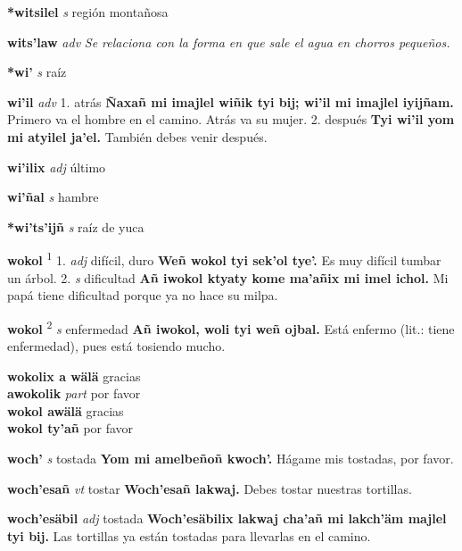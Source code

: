 \documentclass[10pt]{scrbook}
\newcommand{\entry}[1]{\textbf{#1}}
\newcommand{\onedefinition}[1]{#1.}
\newcommand{\defsuperscript}[1]{\textsuperscript{#1}}
\newcommand{\nontranslationdef}[1]{\textit{#1}}
\newcommand{\partofspeech}[1]{\textit{#1}}
\newcommand{\spanishtranslation}[1]{#1}
\newcommand{\cholexample}[1]{\textbf{#1}}
\newcommand{\exampletranslation}[1]{#1}
\newcommand{\secondaryentry}[1]{\\\textbf{#1}}
\newcommand{\secondpartofspeech}[1]{\textit{#1}}
\newcommand{\secondtranslation}[1]{#1}
\begin{document}
\begin{multicols}{2}
\entry{*witsilel}
\partofspeech{s}
\spanishtranslation{región montañosa}

\entry{wits'law}
\partofspeech{adv}
\nontranslationdef{Se relaciona con la forma en que sale el agua en chorros pequeños.}

\entry{*wi'}
\partofspeech{s}
\spanishtranslation{raíz}

\entry{wi'il}
\partofspeech{adv}
\onedefinition{1}
\spanishtranslation{atrás}
\cholexample{Ñaxañ mi imajlel wiñik tyi bij; wi'il mi imajlel iyijñam.}
\exampletranslation{Primero va el hombre en el camino. Atrás va su mujer.}
\onedefinition{2}
\spanishtranslation{después}
\cholexample{Tyi wi'il yom mi atyilel ja'el.}
\exampletranslation{También debes venir después.}

\entry{wi'ilix}
\partofspeech{adj}
\spanishtranslation{último}

\entry{wi'ñal}
\partofspeech{s}
\spanishtranslation{hambre}

\entry{*wi'ts'ijñ}
\partofspeech{s}
\spanishtranslation{raíz de yuca}

\entry{wokol}
\defsuperscript{1}
\onedefinition{1}
\partofspeech{adj}
\spanishtranslation{difícil, duro}
\cholexample{Weñ wokol tyi sek'ol tye'.}
\exampletranslation{Es muy difícil tumbar un árbol.}
\onedefinition{2}
\partofspeech{s}
\spanishtranslation{dificultad}
\cholexample{Añ iwokol ktyaty kome ma'añix mi imel ichol.}
\exampletranslation{Mi papá tiene dificultad porque ya no hace su milpa.}

\entry{wokol}
\defsuperscript{2}
\partofspeech{s}
\spanishtranslation{enfermedad}
\cholexample{Añ iwokol, woli tyi weñ ojbal.}
\exampletranslation{Está enfermo (lit.: tiene enfermedad), pues está tosiendo mucho.}

\entry{wokolix a wälä}
\spanishtranslation{gracias}
\secondaryentry{awokolik}
\secondpartofspeech{part}
\secondtranslation{por favor}
\secondaryentry{wokol awälä}
\secondtranslation{gracias}
\secondaryentry{wokol ty'añ}
\secondtranslation{por favor}

\entry{woch'}
\partofspeech{s}
\spanishtranslation{tostada}
\cholexample{Yom mi amelbeñoñ kwoch'.}
\exampletranslation{Hágame mis tostadas, por favor.}

\entry{woch'esañ}
\partofspeech{vt}
\spanishtranslation{tostar}
\cholexample{Woch'esañ lakwaj.}
\exampletranslation{Debes tostar nuestras tortillas.}

\entry{woch'esäbil}
\partofspeech{adj}
\spanishtranslation{tostada}
\cholexample{Woch'esäbilix lakwaj cha'añ mi lakch'äm majlel tyi bij.}
\exampletranslation{Las tortillas ya están tostadas para llevarlas en el camino.}


\end{multicols}
\end{document}
